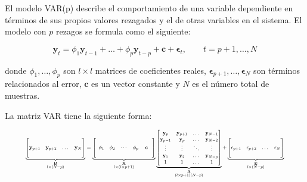 El modelo VAR(p) describe el comportamiento de una variable dependiente en
términos de sus propios valores rezagados y el de otras variables en el
sistema. El modelo con $p$ rezagos se formula como el siguiente:

\begin{equation}
\label{eq:var}
 \mathbf{y}_t = \phi_1 \mathbf{y}_{t-1}  + \dots +   \phi_p\mathbf{y}_{t-p}
 + \mathbf{c} + \mathbf{\epsilon}_t, \qquad t=p+1, \dots, N
 \end{equation}

\noindent donde ${\phi_1,\dots,\phi_p}$ son $l \times l$ matrices de
coeficientes reales, $\mathbf{\epsilon}_{p+1},\dots,\mathbf{\epsilon}_N$ son
términos relacionados al error, $\mathbf{c}$ es un vector constante y $N$ es el
número total de muestras.

La matriz VAR tiene la siguiente forma:

\begin{equation}
 \label{eq:varmatrix}
 \resizebox{0.9\hsize}{!}{$%
               \underbrace{ \begin{bmatrix}
               \quad \\
               \mathbf{y}_{p+1} &
               \mathbf{y}_{p+2} &
               \dots & 
               \mathbf{y}_N \\
               \quad
               \end{bmatrix}}_{\substack{ \mathbf{B}\\l \times (N-p)}}   
= 
                \underbrace{\left[ 
                \begin{array}{ccccc}
                \quad & \quad & \quad & \quad & \quad \\
                \phi_1  & \phi_2 & \cdots & \phi_p & \mathbf{c} \\  
                \quad &\quad & \quad & \quad & \quad
               \end{array} 
               \right]}_{\substack{ \mathbf{X}\\ l \times (l \times p + 1 )}}
\underbrace{\begin{bmatrix}
   \mathbf{y}_{p}  & \mathbf{y}_{p+1} & \dots    & \mathbf{y}_{N-1}\\
   \mathbf{y}_{p-1}  & \mathbf{y}_{p} & \dots    & \mathbf{y}_{N-2}\\
   \vdots        & \vdots   & \ddots   & \vdots\\
   \mathbf{y}_{1} & \mathbf{y}_{2}   & \dots    & \mathbf{y}_{N-p}\\
   1 & 1   & \dots    & 1 
   \end{bmatrix}}_{\substack{ \mathbf{A}\\ (l\times p +1 )(N-p)}}
+
\underbrace{\begin{bmatrix}
                \quad \\
              \mathbf{\epsilon}_{p+1}  & 
              \mathbf{\epsilon}_{p+2}  & 
              \dots                & 
              \mathbf{\epsilon}_N \\
              \quad
             \end{bmatrix}}_{\substack{\mathbf{E}\\l \times (N-p) }} 
$}
\end{equation}
